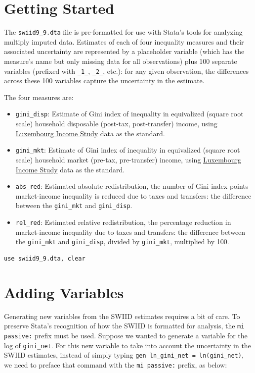 \documentclass[11pt]{article}
\begin{document}
\section{Getting Started}
The \verb+swiid9_9.dta+ file is pre-formatted for use with Stata's tools for analyzing multiply imputed data.  Estimates of each of four inequality measures and their associated uncertainty are represented by a placeholder variable (which has the measure's name but only missing data for all observations) plus 100 separate variables (prefixed with \verb+_1_+, \verb+_2_+, etc.): for any given observation, the differences across these 100 variables capture the uncertainty in the estimate.   

The four measures are:
\begin{itemize}
	\item \verb+gini_disp+: Estimate of Gini index of inequality in equivalized (square root scale) household disposable (post-tax, post-transfer) income, using \href{http://www.lisdatacenter.org}{Luxembourg Income Study} data as the standard.
	\item \verb+gini_mkt+: Estimate of Gini index of inequality in equivalized (square root scale) household market (pre-tax, pre-transfer) income, using \href{http://www.lisdatacenter.org}{Luxembourg Income Study} data as the standard.	
	\item \verb+abs_red+: Estimated absolute redistribution, the number of Gini-index points market-income inequality is reduced due to taxes and transfers: the difference between the \verb+gini_mkt+ and \verb+gini_disp+.
	\item \verb+rel_red+: Estimated relative redistribution, the percentage reduction in market-income inequality due to taxes and transfers: the difference between the \verb+gini_mkt+ and \verb+gini_disp+, divided by \verb+gini_mkt+, multiplied by 100.
\end{itemize}

\begin{verbatim}
use swiid9_9.dta, clear
\end{verbatim}

\section{Adding Variables}
Generating new variables from the SWIID estimates requires a bit of care.  To preserve Stata's recognition of how the SWIID is formatted for analysis, the \verb+mi passive:+ prefix must be used.  Suppose we wanted to generate a variable for the log of \verb+gini_net+.  For this new variable to take into account the uncertainty in the SWIID estimates, instead of simply typing \verb+gen ln_gini_net = ln(gini_net)+, we need to preface that command with the \verb+mi passive:+ prefix, as below:
\end{document}
